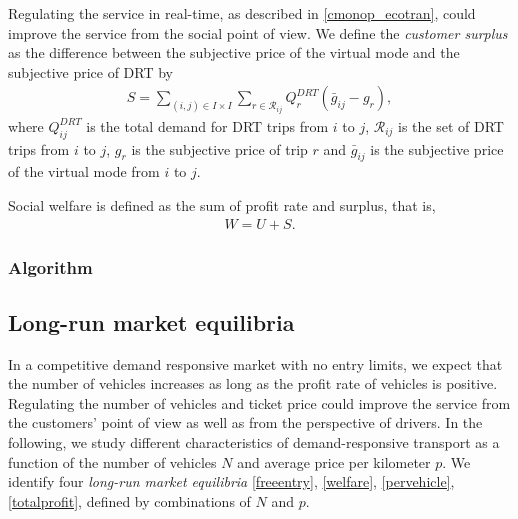 \documentclass[dissertation,draft*]{aaltoseries}
\begin{document}
Regulating the service in real-time, as described in \ref{cmonop_ecotran}, could improve the service
from the social point of view. We define the \emph{customer surplus}
as the difference between the subjective price of the virtual mode and 
the subjective price of DRT by
\begin{align}
\label{surplus}
S = \sum_{(i,j) \in I \times I} \sum_{r \in \mathcal{R}_{ij}} Q^{DRT}_r  (\bar{g}_{ij}-g_r),
\end{align}
where $Q^{DRT}_{ij}$ is the total demand for DRT trips from $i$ to $j$, $\mathcal{R}_{ij}$
is the set of DRT trips from $i$ to $j$, $g_r$ is the subjective price
of trip $r$ and $\bar{g}_{ij}$ is the subjective price of the virtual mode from $i$ to $j$.

Social welfare is defined as the sum of profit rate and surplus, that is, 
\begin{align}
\label{welfare}
 W=U+S.
\end{align}

\subsubsection{Algorithm}



\subsection{Long-run market equilibria}
\label{longrun}
In a competitive demand responsive market with no entry limits, 
we expect that the number of vehicles increases as long as the profit
rate of vehicles is positive. 
Regulating the number of vehicles and ticket price could improve the service
from the customers' point of view as well as from the perspective of drivers.
In the following, we study different characteristics of demand-responsive transport
as a function of the number of vehicles $N$ and average price per kilometer $p$.
We identify four \emph{long-run market equilibria} \eqref{freeentry}, \eqref{welfare},
\eqref{pervehicle}, \eqref{totalprofit}, defined by combinations of $N$ and $p$.
\end{document}
